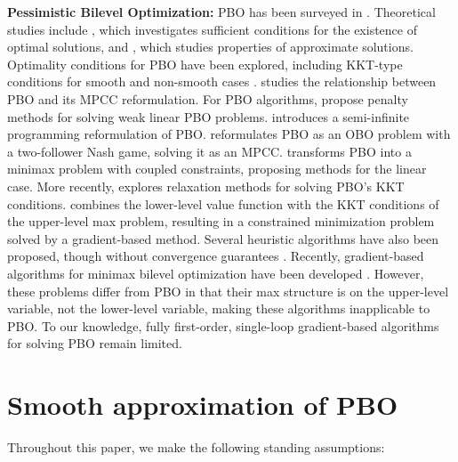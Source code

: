 \documentclass{article}
\begin{document}
\textbf{Pessimistic Bilevel Optimization:}
PBO has been surveyed in \cite{liu2018pessimistic, dempe2020bilevel}.
Theoretical studies include \cite{aboussoror2001existence}, which investigates sufficient conditions for the existence of optimal solutions, and \cite{loridan1988approximate}, which studies properties of approximate solutions. Optimality conditions for PBO have been explored, including KKT-type conditions for smooth and non-smooth cases \cite{dempe2014necessary,dempe2019two}. \cite{aussel2019pessimistic} studies the relationship between PBO and its MPCC reformulation.
For PBO algorithms, \cite{aboussoror2005weak, zheng2013exact} propose penalty methods for solving weak linear PBO problems. \cite{wiesemann2013pessimistic} introduces a semi-infinite programming reformulation of PBO. \cite{lampariello2019standard} reformulates PBO as an OBO problem with a two-follower Nash game, solving it as an MPCC. \cite{zeng2020practical} transforms PBO into a minimax problem with coupled constraints, proposing methods for the linear case. More recently, \cite{benchouk2024relaxation, benchouk2025scholtes} explores relaxation methods for solving PBO’s KKT conditions. \cite{guanadaprox} combines the lower-level value function with the KKT conditions of the upper-level max problem, resulting in a constrained minimization problem solved by a gradient-based method. Several heuristic algorithms have also been proposed, though without convergence guarantees \cite{alves2018semivectorial, alekseeva2017matheuristic}. Recently, gradient-based algorithms for minimax bilevel optimization have been developed \cite{gu2021nonconvex, hustochastic, yang2024first}. However, these problems differ from PBO in that their max structure is on the upper-level variable, not the lower-level variable, making these algorithms inapplicable to PBO.
To our knowledge, fully first-order, single-loop gradient-based algorithms for solving PBO remain limited.




\section{Smooth approximation of PBO}\label{section singlelevelreformulation}


Throughout this paper, we make the following standing assumptions:
\end{document}
